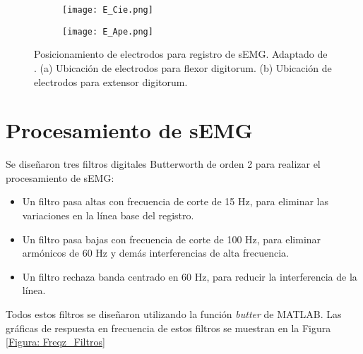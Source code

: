 \vfill
\begin{figure}[htbp]
	\centering
	\begin{subfigure}[htbp]{0.3\textwidth}
		\texttt{[image: E\_Cie.png]}
		\caption{}
		\label{Figura: E_Cie}
	\end{subfigure}
	\hspace{3cm}
	\begin{subfigure}[htbp]{0.3\textwidth}
		\texttt{[image: E\_Ape.png]}
		\caption{}
		\label{Figura: E_Ape}
	\end{subfigure}
	\caption[Posicionamiento de electrodos para registro de sEMG]{Posicionamiento de electrodos para registro de sEMG. Adaptado de \cite{Cavalcanti-Garcia2009}. (a) Ubicación de electrodos para flexor digitorum. (b) Ubicación de electrodos para extensor digitorum.}
	\label{Figura: E_sEMG}
\end{figure}
\vfill

\newpage
\section{Procesamiento de sEMG} \label{Sec: Procesamiento}
Se diseñaron tres filtros digitales Butterworth de orden 2 para realizar el procesamiento de sEMG:

\begin{itemize}
	\item Un filtro pasa altas con frecuencia de corte de 15 Hz, para eliminar las variaciones en la línea base del registro.
	\item Un filtro pasa bajas con frecuencia de corte de 100 Hz, para eliminar armónicos de 60 Hz y demás interferencias de alta frecuencia.
	\item Un filtro rechaza banda centrado en 60 Hz, para reducir la interferencia de la línea.
\end{itemize}

Todos estos filtros se diseñaron utilizando la función \emph{butter} de MATLAB\textregistered. Las gráficas de respuesta en frecuencia de estos filtros se muestran en la Figura \ref{Figura: Freqz_Filtros} 

